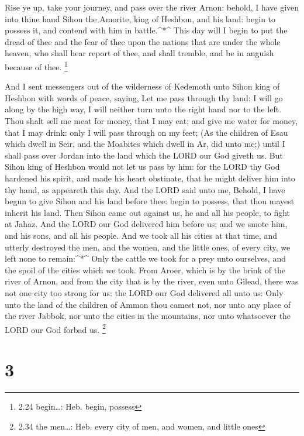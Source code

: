  Rise ye up, take your journey, and pass over the river
Arnon: behold, I have given into thine hand Sihon the Amorite, king of
Heshbon, and his land: begin to possess it, and contend with him in
battle.\^{}*\^{}  This day will I begin to put the dread of
thee and the fear of thee upon the nations that are under the whole
heaven, who shall hear report of thee, and shall tremble, and be in
anguish because of thee. \footnote{2.24 begin\ldots: Heb. begin, possess}

 And I sent messengers out of the wilderness of Kedemoth
unto Sihon king of Heshbon with words of peace, saying, 
Let me pass through thy land: I will go along by the high way, I will
neither turn unto the right hand nor to the left.  Thou
shalt sell me meat for money, that I may eat; and give me water for
money, that I may drink: only I will pass through on my feet;
 (As the children of Esau which dwell in Seir, and the
Moabites which dwell in Ar, did unto me;) until I shall pass over Jordan
into the land which the LORD our God giveth us.  But Sihon
king of Heshbon would not let us pass by him: for the LORD thy God
hardened his spirit, and made his heart obstinate, that he might deliver
him into thy hand, as appeareth this day.  And the LORD
said unto me, Behold, I have begun to give Sihon and his land before
thee: begin to possess, that thou mayest inherit his land. 
Then Sihon came out against us, he and all his people, to fight at
Jahaz.  And the LORD our God delivered him before us; and
we smote him, and his sons, and all his people.  And we
took all his cities at that time, and utterly destroyed the men, and the
women, and the little ones, of every city, we left none to
remain:\^{}*\^{}  Only the cattle we took for a prey unto
ourselves, and the spoil of the cities which we took.  From
Aroer, which is by the brink of the river of Arnon, and from the city
that is by the river, even unto Gilead, there was not one city too
strong for us: the LORD our God delivered all unto us: 
Only unto the land of the children of Ammon thou camest not, nor unto
any place of the river Jabbok, nor unto the cities in the mountains, nor
unto whatsoever the LORD our God forbad us. \footnote{2.34 the
  men\ldots: Heb. every city of men, and women, and little ones}

\hypertarget{section-2}{%
\section{3}\label{section-2}}

